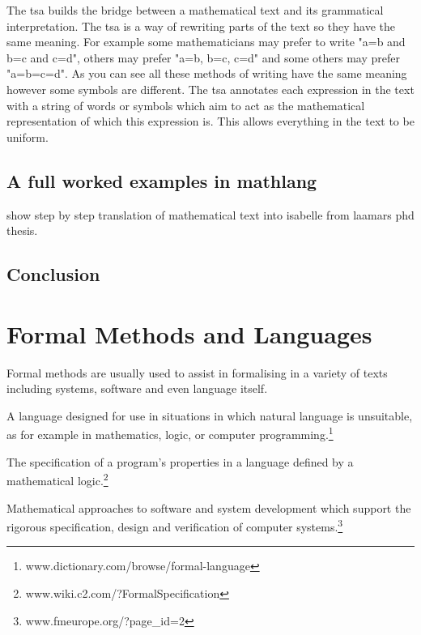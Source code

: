 The \gls{tsa} builds the bridge between a mathematical text and its grammatical interpretation. The \gls{tsa} is a way of rewriting parts of the text so they have the same meaning. For example some mathematicians may prefer to write "a=b and b=c and c=d", others may prefer "a=b, b=c, c=d" and some others may prefer "a=b=c=d". As you can see all these methods of writing have the same meaning however some symbols are different. The \gls{tsa} annotates each expression in the text with a string of words or symbols which aim to act as the mathematical representation of which this expression is. This allows everything in the text to be uniform.

\subsection{A full worked examples in mathlang}

show step by step translation of mathematical text into isabelle from laamars phd thesis.

\subsection{Conclusion}

\section{Formal Methods and Languages}
\label{sec:formalmethodsandformallanguages}

Formal methods are usually used to assist in formalising in a variety of texts including systems, software and even language itself.

\begin{defin}
A language designed for use in situations in which natural language is unsuitable, as for example in mathematics, logic, or computer programming.\footnote{www.dictionary.com/browse/formal-language}
\end{defin}

\begin{defin}
The specification of a program's properties in a language defined by a mathematical logic.\footnote{www.wiki.c2.com/?FormalSpecification}
\end{defin}

\begin{defin}
Mathematical approaches to software and system development which support the rigorous specification, design and verification of computer systems.\footnote{www.fmeurope.org/?page\_id=2}
\end{defin}

